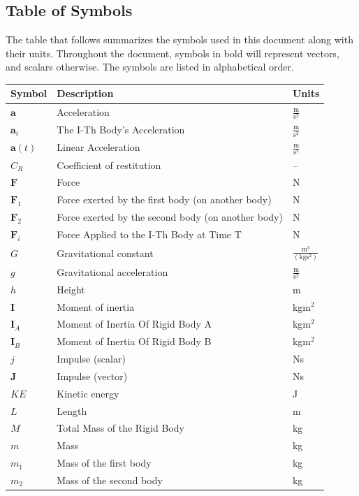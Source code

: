 \documentclass[12pt]{article}
\begin{document}
\subsection{Table of Symbols}
\label{Sec:ToS}
The table that follows summarizes the symbols used in this document along with their units. Throughout the document, symbols in bold will represent vectors, and scalars otherwise. The symbols are listed in alphabetical order.
\begin{longtabu}{l X[l] l}
\toprule
Symbol & Description & Units
\\
\midrule
\endhead
$\mathbf{a}$ & Acceleration & $\frac{\text{m}}{\text{s}^{2}}$
\\
${\mathbf{a}_{i}}$ & The I-Th Body's Acceleration & $\frac{\text{m}}{\text{s}^{2}}$
\\
$\mathbf{a}(t)$ & Linear Acceleration & $\frac{\text{m}}{\text{s}^{2}}$
\\
${C_{R}}$ & Coefficient of restitution & --
\\
$\mathbf{F}$ & Force & N
\\
${\mathbf{F}_{1}}$ & Force exerted by the first body (on another body) & N
\\
${\mathbf{F}_{2}}$ & Force exerted by the second body (on another body) & N
\\
${\mathbf{F}_{i}}$ & Force Applied to the I-Th Body at Time T & N
\\
$G$ & Gravitational constant & $\frac{\text{m}^{3}}{(\text{kg}\text{s}^{2})}$
\\
$g$ & Gravitational acceleration & $\frac{\text{m}}{\text{s}^{2}}$
\\
$h$ & Height & m
\\
$\mathbf{I}$ & Moment of inertia & kg$\text{m}^{2}$
\\
${\mathbf{I}_{A}}$ & Moment of Inertia Of Rigid Body A & kg$\text{m}^{2}$
\\
${\mathbf{I}_{B}}$ & Moment of Inertia Of Rigid Body B & kg$\text{m}^{2}$
\\
$j$ & Impulse (scalar) & Ns
\\
$\mathbf{J}$ & Impulse (vector) & Ns
\\
$KE$ & Kinetic energy & J
\\
$L$ & Length & m
\\
$M$ & Total Mass of the Rigid Body & kg
\\
$m$ & Mass & kg
\\
${m_{1}}$ & Mass of the first body & kg
\\
${m_{2}}$ & Mass of the second body & kg

\end{longtabu}
\end{document}
